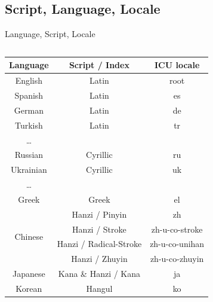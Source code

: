 \documentclass[aspectratio=169,10pt]{beamer}
\begin{document}

\subsection{Script, Language, Locale}

\begin{frame}[fragile]{Language, Script, Locale}

\setlength\dashlinedash{0.5pt}
\setlength\dashlinegap{1.0pt}

\begin{columns}
\begin{column}{70mm}
\footnotesize
\begin{center}
\begin{tabular}{ccc}
  Language  & Script / Index             & ICU locale \\\hline\hline
  English   & Latin                      & root           \\
  Spanish   & Latin                      & es             \\
  German    & Latin                      & de             \\
  Turkish   & Latin                      & tr             \\
  \ldots    &                            &                \\\hdashline
  Russian   & Cyrillic                   & ru             \\
  Ukrainian & Cyrillic                   & uk             \\
  \ldots    &                            &                \\\hdashline
  Greek     & Greek                      & el             \\\hline
  \multirow{4}{*}{Chinese}   & Hanzi / Pinyin         & zh             \\
            & Hanzi       / Stroke         & zh-u-co-stroke \\
            & Hanzi       / Radical-Stroke & zh-u-co-unihan \\
            & Hanzi       / Zhuyin         & zh-u-co-zhuyin \\\hdashline
  Japanese  & Kana \& Hanzi / Kana       & ja             \\\hdashline
  Korean    & Hangul                     & ko             \\\hline
\end{tabular}

\end{center}
\end{column}
\end{columns}
\end{frame}
\end{document}
